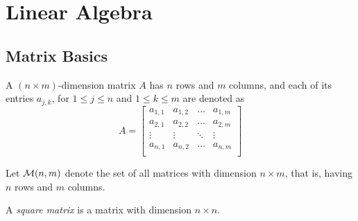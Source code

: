 \chapter{Linear Algebra}

\section{Matrix Basics}

\begin{definition}[Matrix]
    A $(n \times m)$-dimension matrix $A$ has $n$ rows and $m$ columns, and each of its entries $a_{j, k}$, for $1 \le j \le n$ and $1 \le k \le m$ are denoted as
    \begin{equation}
        A = \begin{bmatrix}
            a_{1, 1} & a_{1, 2} & \dots  & a_{1, m} \\
            a_{2, 1} & a_{2, 2} & \dots  & a_{2, m} \\
            \vdots   & \vdots   & \ddots & \vdots   \\
            a_{n, 1} & a_{n, 2} & \dots & a_{n, m} \\
        \end{bmatrix}
    \end{equation}
\end{definition}

\begin{definition}
    Let $\mathcal{M}(n, m)$ denote the set of all matrices with dimension $n \times m$, that is, having $n$ rows and $m$ columns.
\end{definition}

\begin{definition}
    A \textit{square matrix} is a matrix with dimension $n \times n$.
\end{definition}

